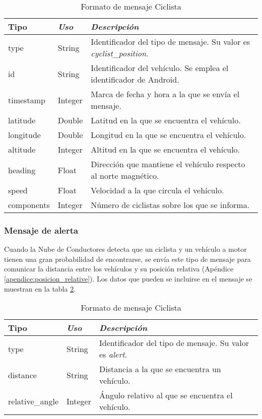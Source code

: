 \begin{table}[h]
	\centering
	\caption{Formato de mensaje Ciclista}\label{tab:CamposMensajePosCiclistaNubeConductores}
	\begin{tabular}{lll}
		\toprule
			\textbf{Tipo} & \emph{Uso} & \emph{Descripción}\\
		\midrule
			type			&	String	&	Identificador del tipo de mensaje. Su valor es
														\emph{cyclist\_position}.	\\
			id				&	String	&	Identificador del vehículo. Se emplea el
														identificador de Android.		\\
			timestamp	&	Integer	&	Marca de fecha y hora a la que se envía el mensaje.	\\
			latitude	&	Double	&	Latitud en la que se encuentra el vehículo.	\\
			longitude	&	Double	&	Longitud en la que se encuentra el vehículo.\\
			altitude	&	Integer	&	Altitud en la que se encuentra el vehículo.	\\
			heading		&	Float		&	Dirección que mantiene el vehículo respecto al
														norte magnético.\\
			speed			&	Float		&	Velocidad a la que circula el vehículo.	\\
			components 	&	Integer	&	Número de ciclistas sobre los que se informa. \\
		\bottomrule
	\end{tabular}
\end{table}
\FloatBarrier
\subsubsection{Mensaje de alerta}\label{sssection:MensajeAlerta}
Cuando la Nube de Conductores detecta que un ciclista y un vehículo a
motor tienen una gran probabilidad de encontrarse, se envía este tipo de
mensaje para comunicar la distancia entre los vehículos y su posición relativa
(Apéndice \ref{apendice:posicion_relative}). Los datos que pueden se incluirse
en el mensaje se muestran en la tabla
\ref{tab:CamposMensajePosCiclistaNubeConductores}.

\begin{table}[h]
	\centering
	\caption{Formato de mensaje Ciclista}
	\label{tab:CamposMensajePosCiclistaNubeConductores}
	\begin{tabular}{lll}
		\toprule
			\textbf{Tipo} & \emph{Uso} & \emph{Descripción}\\
		\midrule
			type						&	String	&	Identificador del tipo de mensaje. Su valor es
														\emph{alert}.	\\
			distance				&	String	&	Distancia a la que se encuentra un vehículo.\\
			relative\_angle	&	Integer	&	Ángulo relativo al que se encuentra
											el vehículo.\\
		\bottomrule
	\end{tabular}
\end{table}
